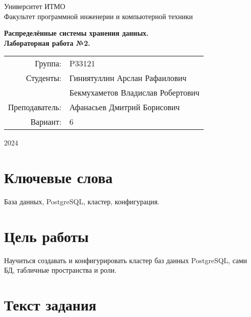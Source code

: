 \documentclass{article}
\begin{document}
\begin{titlepage}
    \begin{center}
        \begin{spacing}{1.4}
            \large{Университет ИТМО} \\
            \large{Факультет программной инженерии и компьютерной техники} \\
        \end{spacing}
        \vfill
        \textbf{
            \huge{Распределённые системы хранения данных.} \\
            \huge{Лабораторная работа №2.} \\
        }
    \end{center}
    \vfill
    \begin{center}
        \begin{tabular}{r l}
            Группа:        & P33121                      \\
            Студенты:       & Гиниятуллин Арслан Рафаилович \\
                            & Бекмухаметов Владислав Робертович   \\
            Преподаватель: & Афанасьев Дмитрий Борисович \\
            Вариант:       & 6 \\
        \end{tabular}
    \end{center}
    \vfill
    \begin{center}
        \begin{large}
            2024
        \end{large}
    \end{center}
\end{titlepage}

\section*{Ключевые слова}

База данных, PostgreSQL, кластер, конфигурация.

\tableofcontents

\section{Цель работы}

Научиться создавать и конфигурировать кластер баз данных PostgreSQL, сами БД, табличные пространства и роли.

\section{Текст задания}
\end{document}
